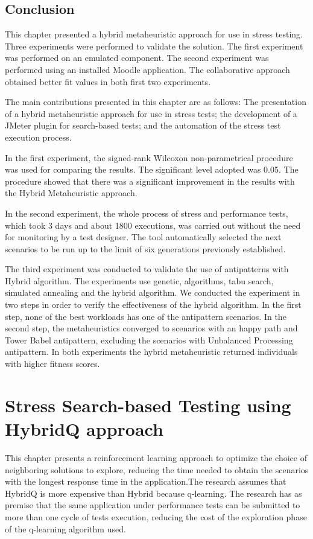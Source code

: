 \documentclass[espaco=umemeio,chapter=TITLE,twoside,openright]{abnt}
\begin{document}
\section{Conclusion}

This chapter presented a hybrid metaheuristic approach for use in stress testing. Three experiments were performed to validate the solution. The first experiment was performed on an emulated component. The second experiment was performed using an installed Moodle application.  The collaborative approach obtained better fit values in both first two experiments.

The main contributions presented in this chapter are as follows: The presentation of a hybrid metaheuristic approach for use in stress tests; the development of a JMeter plugin  for search-based tests; and  the automation of the stress test execution process.

In the first experiment, the signed-rank Wilcoxon non-parametrical procedure was used for comparing the results. The significant level adopted was 0.05. The procedure showed that there was a significant improvement in the results with the Hybrid Metaheuristic approach.

In the second experiment, the whole process of stress and performance tests, which took 3 days and about 1800 executions, was carried out without the need for monitoring by a test designer. The tool automatically selected the next scenarios to be run up to the limit of six generations previously established.

The third experiment was conducted to validate the use of antipatterns with Hybrid algorithm. The experiments use genetic, algorithms, tabu search, simulated annealing and the hybrid algorithm.  We conducted the experiment in two steps in order to verify the effectiveness of the hybrid algorithm.  In the first step, none of the best workloads has one of the antipattern scenarios. In the second step,  the metaheuristics converged to scenarios with an happy path and Tower Babel antipattern, excluding the scenarios with Unbalanced Processing antipattern. In both experiments the hybrid metaheuristic returned individuals with higher fitness scores. 


\chapter{Stress Search-based Testing using HybridQ approach}


This chapter presents a reinforcement learning approach to optimize the choice of neighboring solutions to explore, reducing the time needed to obtain the scenarios with the longest response time in the application.The research assumes that HybridQ is more expensive than Hybrid because q-learning. The research has as premise that the same application under performance tests can be submitted to more than one cycle of tests execution, reducing the cost of the exploration phase of the q-learning algorithm used. 
\end{document}

